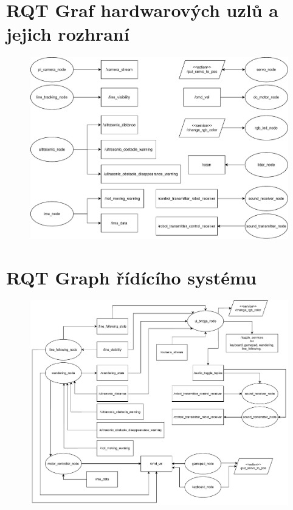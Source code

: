 
%

\chapter{RQT Graf hardwarových uzlů a jejich rozhraní}

\begin{figure}[h!]
	\centering
	\includegraphics[scale=0.65]{obrazky-figures/hardware_nodes.pdf}
	\caption{}
	\label{}
\end{figure}

\chapter{RQT Graph řídícího systému}

\begin{figure}[h!]
	\centering
	\includegraphics[scale=0.55]{obrazky-figures/controller_nodes.pdf}
	\caption{}
	\label{}
\end{figure}

%
